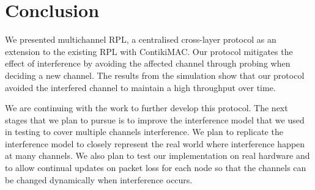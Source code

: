 \section{Conclusion}
\label{sec:conclusion}


We presented multichannel RPL, a centralised cross-layer protocol as an extension to the existing RPL with ContikiMAC. Our protocol mitigates the effect of interference by avoiding the affected channel through probing when deciding a new channel. The results from the simulation show that our protocol avoided the interfered channel to maintain a high throughput over time. 

We are continuing with the work to further develop this protocol. The next stages that we plan to pursue is to improve the interference model that we used in testing to cover multiple channels interference. We plan to replicate the interference model to closely represent the real world where interference happen at many channels. We also plan to test our implementation on real hardware and to allow continual updates on packet loss for each node so that the channels can be changed dynamically when interference occurs.


